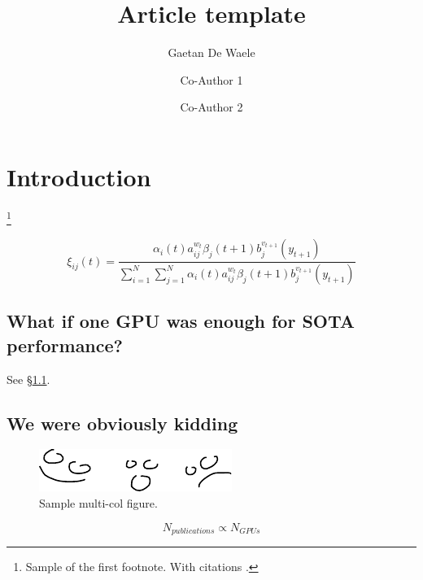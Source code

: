 \documentclass[twocolumn]{article}
\title{Article template}
\author[1, *]{Gaetan De Waele}
\author[1]{Co-Author 1}
\author[2]{Co-Author 2}
\affil[1]{Ghent University}
\affil[2]{Institute of X}
\affil[*]{Correspondence to <mail@address.com>.}
\begin{document}
\section{Introduction}
\lipsum[1]\footnote{Sample of the first footnote. With citations \citep{devlin2018bert}.}

\begin{equation}
	\xi _{ij}(t)= {\frac {\alpha _{i}(t)a^{w_t}_{ij}\beta _{j}(t+1)b^{v_{t+1}}_{j}(y_{t+1})}{\sum _{i=1}^{N} \sum _{j=1}^{N} \alpha _{i}(t)a^{w_t}_{ij}\beta _{j}(t+1)b^{v_{t+1}}_{j}(y_{t+1})}}
\end{equation}

\lipsum[2]

\subsection{What if one GPU was enough for SOTA performance?} \label{sec:onegpu}
\lipsum[3] See \S \ref{sec:onegpu}.

\subsection{We were obviously kidding}
\lipsum[4]

\begin{figure}[t!]
	\centering
	\includegraphics[width=0.50\linewidth]{emotion}
	\caption{Sample multi-col figure.}
	\label{fig:fig2}
\end{figure}

\begin{equation}
	N_{publications} \propto N_{GPUs}
\end{equation}
\end{document}
